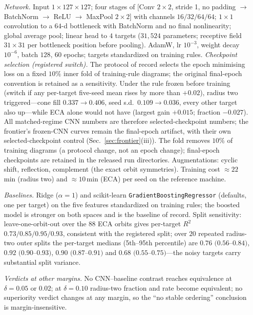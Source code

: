 \documentclass[aip,cha,amsmath,amssymb,reprint,floatfix]{revtex4-2}
\newcommand{\rtwo}{$R^2$}
\begin{document}
\emph{Network.} Input $1\times127\times127$; four stages of [Conv $2\times2$,
stride 1, no padding $\to$ BatchNorm $\to$ ReLU $\to$ MaxPool $2\times2$] with
channels $16/32/64/64$; $1\times1$ convolution to a $64$-d bottleneck with
BatchNorm and no final nonlinearity; global average pool; linear head to $4$
targets ($31{,}524$ parameters; receptive field $31\times31$ per bottleneck
position before pooling). AdamW, lr $10^{-3}$, weight decay $10^{-6}$, batch
$128$, $60$ epochs; targets standardized on training rules. \emph{Checkpoint
selection (registered switch).} The protocol of record selects the epoch
minimising loss on a fixed $10\%$ inner fold of training-rule diagrams; the
original final-epoch convention is retained as a sensitivity. Under the rule
frozen before training (switch if any per-target five-seed mean rises by more
than $+0.02$), radius two triggered---cone fill $0.337\to0.406$, seed s.d.\
$0.109\to0.036$, every other target also up---while ECA alone would not have
(largest gain $+0.015$; fraction $-0.027$). All matched-regime CNN numbers
are therefore selected-checkpoint numbers; the frontier's frozen-CNN curves
remain the final-epoch artifact, with their own selected-checkpoint control
(Sec.~\ref{sec:frontier}(iii)). The fold removes $10\%$ of training
diagrams (a protocol change, not an epoch change); final-epoch checkpoints
are retained in the released run directories.
Augmentations: cyclic shift, reflection, complement (the exact
orbit symmetries). Training cost $\approx22$\,min (radius two) and
$\approx10$\,min (ECA) per seed on the reference machine.

\emph{Baselines.} Ridge ($\alpha=1$) and scikit-learn
\texttt{GradientBoostingRegressor} (defaults, one per target) on the five
features standardized on training rules; the boosted model is stronger on both
spaces and is the baseline of record. Split sensitivity: leave-one-orbit-out
over the $88$ ECA orbits gives per-target \rtwo{} $0.73/0.85/0.95/0.93$,
consistent with the registered split; over $20$ repeated radius-two outer
splits the per-target medians (5th--95th percentile) are $0.76$
$(0.56$--$0.84)$, $0.92$ $(0.90$--$0.93)$, $0.90$ $(0.87$--$0.91)$ and $0.68$
$(0.55$--$0.75)$---the noisy targets carry substantial split variance.

\emph{Verdicts at other margins.} No CNN--baseline contrast reaches
equivalence at $\delta=0.05$ or $0.02$; at $\delta=0.10$ radius-two fraction
and rate become equivalent; no superiority verdict changes at any margin, so
the ``no stable ordering'' conclusion is margin-insensitive.
\end{document}
